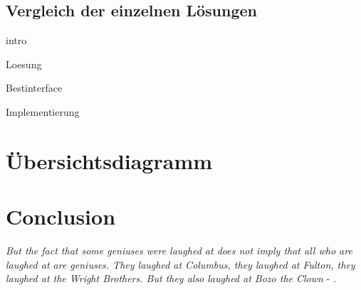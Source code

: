 \documentclass{article}
\begin{document}
    \newpage
    \subsection{Vergleich der einzelnen Lösungen}
        {intro}


{Loesung}


\newpage
{Bestinterface}

\newpage
{Implementierung}

\section{Übersichtsdiagramm}

\section{Conclusion}
\textit{But the fact that some geniuses were laughed at does not imply that all who are laughed at are geniuses. They laughed at Columbus, they laughed at Fulton, they laughed at the Wright Brothers. But they also laughed at Bozo the Clown} -  \textcite{sagan_1993}.

\newpage
\printbibliography[heading = bibintoc, title = Bibliography]    %

\end{document}
